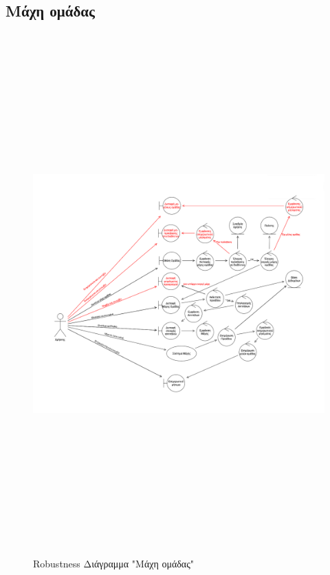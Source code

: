 \subsection{Μάχη ομάδας}
\begin{figure}[!htb]
  \begin{center}
    \includegraphics[width=18cm,height=20cm]{robust_teambattle.png}
    \caption{Robustness Διάγραμμα "Μάχη ομάδας"}
    \label{}
     \end{center}
\end{figure}